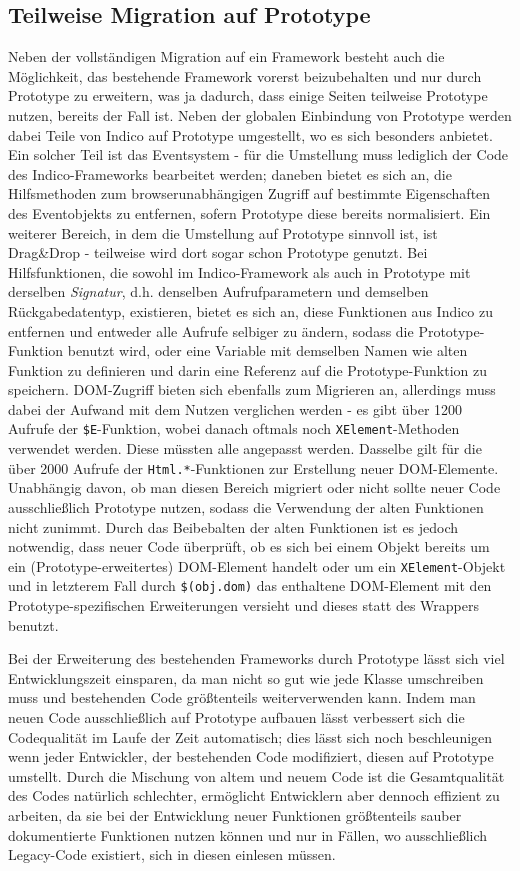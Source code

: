 \subsection{Teilweise Migration auf Prototype}
Neben der vollständigen Migration auf ein Framework besteht auch die Möglichkeit, das bestehende
Framework vorerst beizubehalten und nur durch Prototype zu erweitern, was ja dadurch, dass einige
Seiten teilweise Prototype nutzen, bereits der Fall ist. Neben der globalen Einbindung von Prototype
werden dabei Teile von Indico auf Prototype umgestellt, wo es sich besonders anbietet. Ein solcher
Teil ist das Eventsystem - für die Umstellung muss lediglich der Code des Indico-Frameworks
bearbeitet werden; daneben bietet es sich an, die Hilfsmethoden zum browserunabhängigen Zugriff auf
bestimmte Eigenschaften des Eventobjekts zu entfernen, sofern Prototype diese bereits normalisiert.
Ein weiterer Bereich, in dem die Umstellung auf Prototype sinnvoll ist, ist Drag\&Drop - teilweise
wird dort sogar schon Prototype genutzt. Bei Hilfsfunktionen, die sowohl im Indico-Framework als
auch in Prototype mit derselben \emph{Signatur}, d.h. denselben Aufrufparametern und demselben
Rückgabedatentyp, existieren, bietet es sich an, diese Funktionen aus Indico zu entfernen und
entweder alle Aufrufe selbiger zu ändern, sodass die Prototype-Funktion benutzt wird, oder eine
Variable mit demselben Namen wie alten Funktion zu definieren und darin eine Referenz auf die
Prototype-Funktion zu speichern. DOM-Zugriff bieten sich ebenfalls zum Migrieren an, allerdings muss
dabei der Aufwand mit dem Nutzen verglichen werden - es gibt über 1200 Aufrufe der
\lstinline{$E}-Funktion, wobei danach oftmals noch \lstinline{XElement}-Methoden verwendet werden.
Diese müssten alle angepasst werden. Dasselbe gilt für die über 2000 Aufrufe der
\lstinline{Html.*}-Funktionen zur Erstellung neuer DOM-Elemente. Unabhängig davon, ob man diesen
Bereich migriert oder nicht sollte neuer Code ausschließlich Prototype nutzen, sodass die Verwendung
der alten Funktionen nicht zunimmt. Durch das Beibebalten der alten Funktionen ist es jedoch
notwendig, dass neuer Code überprüft, ob es sich bei einem Objekt bereits um ein
(Prototype-erweitertes) DOM-Element handelt oder um ein \lstinline{XElement}-Objekt und in letzterem
Fall durch \lstinline{$(obj.dom)} das enthaltene DOM-Element mit den Prototype-spezifischen
Erweiterungen versieht und dieses statt des Wrappers benutzt.

Bei der Erweiterung des bestehenden Frameworks durch Prototype lässt sich viel Entwicklungszeit
einsparen, da man nicht so gut wie jede Klasse umschreiben muss und bestehenden Code größtenteils
weiterverwenden kann. Indem man neuen Code ausschließlich auf Prototype aufbauen lässt verbessert
sich die Codequalität im Laufe der Zeit automatisch; dies lässt sich noch beschleunigen wenn jeder
Entwickler, der bestehenden Code modifiziert, diesen auf Prototype umstellt. Durch die Mischung von
altem und neuem Code ist die Gesamtqualität des Codes natürlich schlechter, ermöglicht Entwicklern
aber dennoch effizient zu arbeiten, da sie bei der Entwicklung neuer Funktionen größtenteils sauber
dokumentierte Funktionen nutzen können und nur in Fällen, wo ausschließlich Legacy-Code existiert,
sich in diesen einlesen müssen.


